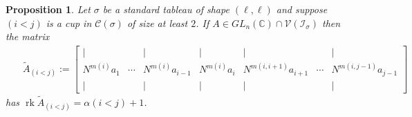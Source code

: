 \documentclass[10pt,a4paper]{amsart}
\newtheorem{prop}{Proposition}
\newcommand{\C}{\mathbb{C}}           %
\newcommand{\al}{\alpha}
\newcommand{\cc}{\mathcal{C}}
\newcommand{\ci}{\mathcal{I}}
\newcommand{\cv}{\mathcal{V}}
\newcommand{\gs}{\sigma}
\newcommand{\m}[2]{m(#1,#2)}
\newcommand{\mi}[1]{m(#1)}
\newcommand{\rk}{\operatorname{rk}}
\begin{document}
\begin{prop}\label{prop.aug.rank} Let $\gs$ be a standard tableau of shape $(\ell, \ell)$ and suppose $(i<j)$ is a cup in $\cc(\gs)$ of size at least $2$. If $A\in GL_n(\C)\cap\cv(\ci_\gs)$ then the matrix
\begin{eqnarray}\label{eqn.extmatrix}
\;\;\;\;\;\widetilde{A}_{(i<j)} :=  \begin{bmatrix} | &  & | & | & | &  & |  \\ N^{\mi{i}}a_1 & \cdots & N^{\mi{i}}a_{i-1} & N^{\mi{i}}a_i & N^{\m{i}{i+1}}a_{i+1} & \cdots & N^{\m{i}{j-1}}a_{j-1} \\| &   & | & | & | & &|  \end{bmatrix}
\end{eqnarray}
has $\rk \widetilde{A}_{(i<j)} =\al(i<j)+1$. 
\end{prop}
\end{document}
